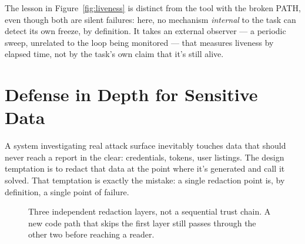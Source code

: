 \documentclass[10pt]{article}
\begin{document}
The lesson in Figure~\ref{fig:liveness} is distinct from the tool with the broken PATH, even though both are silent failures: here, no mechanism \emph{internal} to the task can detect its own freeze, by definition. It takes an external observer --- a periodic sweep, unrelated to the loop being monitored --- that measures liveness by elapsed time, not by the task's own claim that it's still alive.

\section{Defense in Depth for Sensitive Data}

A system investigating real attack surface inevitably touches data that should never reach a report in the clear: credentials, tokens, user listings. The design temptation is to redact that data at the point where it's generated and call it solved. That temptation is exactly the mistake: a single redaction point is, by definition, a single point of failure.

\begin{figure}[h]
\centering
{}
\caption{Three independent redaction layers, not a sequential trust chain. A new code path that skips the first layer still passes through the other two before reaching a reader.}
\label{fig:redact}
\end{figure}
\end{document}
